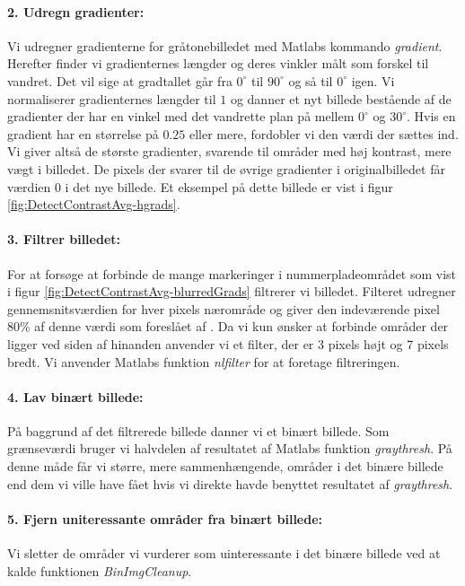\paragraph{2. Udregn gradienter:}
Vi udregner gradienterne for gråtonebilledet med Matlabs kommando \textit{gradient}. Herefter finder vi gradienternes længder og deres vinkler målt som forskel til vandret. Det vil sige at gradtallet går fra $0^\circ$ til $90^\circ$ og så til $0^\circ$ igen. Vi normaliserer gradienternes længder til $1$ og danner et nyt billede bestående af de gradienter der har en vinkel med det vandrette plan på mellem $0^\circ$ og $30^\circ$. Hvis en gradient har en størrelse på $0.25$ eller mere, fordobler vi den værdi der sættes ind. Vi giver altså de største gradienter, svarende til områder med høj kontrast, mere vægt i billedet. De pixels der svarer til de øvrige gradienter i originalbilledet får værdien $0$ i det nye billede. Et eksempel på dette billede er vist i figur \vref{fig:DetectContrastAvg-hgrads}.

\paragraph{3. Filtrer billedet:}
For at forsøge at forbinde de mange markeringer i nummerpladeområdet som vist i figur \vref{fig:DetectContrastAvg-blurredGrads} filtrerer vi billedet. Filteret udregner gennemsnitsværdien for hver pixels nærområde og giver den indeværende pixel 80\% af denne værdi som foreslået af \cite{shapiro}. Da vi kun ønsker at forbinde områder der ligger ved siden af hinanden anvender vi et filter, der er 3 pixels højt og 7 pixels bredt. Vi anvender Matlabs funktion \textit{nlfilter} for at foretage filtreringen.

\paragraph{4. Lav binært billede:}
På baggrund af det filtrerede billede danner vi et binært billede. Som grænseværdi bruger vi halvdelen af resultatet af Matlabs funktion \textit{graythresh}. På denne måde får vi større, mere sammenhængende, områder i det binære billede end dem vi ville have fået hvis vi direkte havde benyttet resultatet af \textit{graythresh}.

\paragraph{5. Fjern uniteressante områder fra binært billede:}
Vi sletter de områder vi vurderer som uinteressante i det binære billede ved at kalde funktionen \textit{BinImgCleanup}.

